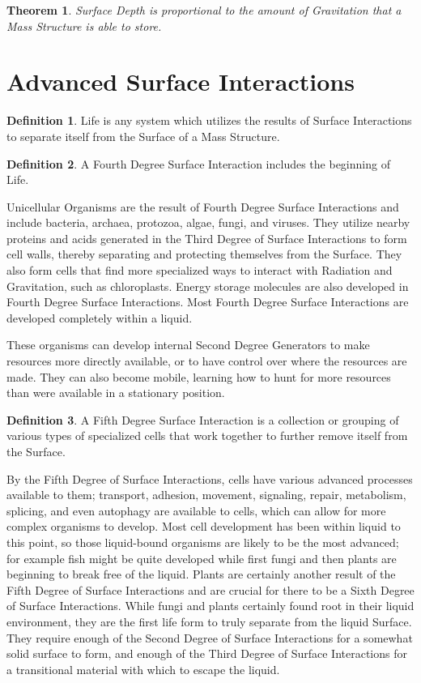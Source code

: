 \documentclass[12pt]{article}
\theoremstyle{plain}
\newtheorem{theorem}{Theorem}
\theoremstyle{definition}
\newtheorem{definition}{Definition}
\begin{document}
\begin{theorem}
Surface Depth is proportional to the amount of Gravitation that a Mass Structure is able to store.
\end{theorem}

\section*{Advanced Surface Interactions}

\begin{definition}
Life is any system which utilizes the results of Surface Interactions to separate itself from the Surface of a Mass Structure.
\end{definition}

\begin{definition}
A Fourth Degree Surface Interaction includes the beginning of Life.
\end{definition}

Unicellular Organisms are the result of Fourth Degree Surface Interactions and include bacteria, archaea, protozoa, algae, fungi, and viruses. They utilize nearby proteins and acids generated in the Third Degree of Surface Interactions to form cell walls, thereby separating and protecting themselves from the Surface. They also form cells that find more specialized ways to interact with Radiation and Gravitation, such as chloroplasts. Energy storage molecules are also developed in Fourth Degree Surface Interactions. Most Fourth Degree Surface Interactions are developed completely within a liquid.

These organisms can develop internal Second Degree Generators to make resources more directly available, or to have control over where the resources are made. They can also become mobile, learning how to hunt for more resources than were available in a stationary position.

\begin{definition}
A Fifth Degree Surface Interaction is a collection or grouping of various types of specialized cells that work together to further remove itself from the Surface.
\end{definition}

By the Fifth Degree of Surface Interactions, cells have various advanced processes available to them; transport, adhesion, movement, signaling, repair, metabolism, splicing, and even autophagy are available to cells, which can allow for more complex organisms to develop. Most cell development has been within liquid to this point, so those liquid-bound organisms are likely to be the most advanced; for example fish might be quite developed while first fungi and then plants are beginning to break free of the liquid. Plants are certainly another result of the Fifth Degree of Surface Interactions and are crucial for there to be a Sixth Degree of Surface Interactions. While fungi and plants certainly found root in their liquid environment, they are the first life form to truly separate from the liquid Surface. They require enough of the Second Degree of Surface Interactions for a somewhat solid surface to form, and enough of the Third Degree of Surface Interactions for a transitional material with which to escape the liquid.
\end{document}
